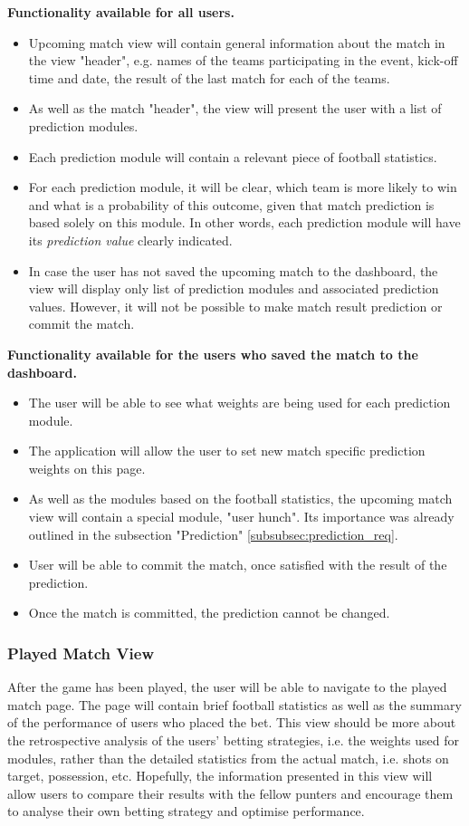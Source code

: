 \textbf{Functionality available for all users.}
\begin{itemize}
	 \item Upcoming match view will contain general information about the match in the view "header", e.g. names of the teams participating in the event, kick-off time and date, the result of the last match for each of the teams.
    \item As well as the match "header", the view will present the user with a list of prediction modules.
    \item Each prediction module will contain a relevant piece of football statistics.
    \item For each prediction module, it will be clear, which team is more likely to win and what is a probability of this outcome, given that match prediction is based solely on this module. In other words, each prediction module will have its \emph{prediction value} clearly indicated.
    \item In case the user has not saved the upcoming match to the dashboard, the view will display only list of prediction modules and associated prediction values. However, it will not be possible to make match result prediction or commit the match.
   \end{itemize}
   
\textbf{Functionality available for the users who saved the match to the dashboard.}
\begin{itemize}
	\item The user will be able to see what weights are being used for each prediction module.
    \item The application will allow the user to set new match specific prediction weights on this page.
    \item As well as the modules based on the football statistics, the upcoming match view will contain a special module, "user hunch". Its importance was already outlined in the subsection "Prediction" \ref{subsubsec:prediction_req}. 
    \item User will be able to commit the match, once satisfied with the result of the prediction.
    \item Once the match is committed, the prediction cannot be changed.
\end{itemize}

\subsubsection{Played Match View}
\label{subsubsec:playedmatch_req}
After the game has been played, the user will be able to navigate to the played match page. The page will contain brief football statistics as well as the summary of the performance of users who placed the bet. This view should be more about the retrospective analysis of the users' betting strategies, i.e. the weights used for modules, rather than the detailed statistics from the actual match, i.e. shots on target, possession, etc. Hopefully, the information presented in this view will allow users to compare their results with the fellow punters and encourage them to analyse their own betting strategy and optimise performance.

